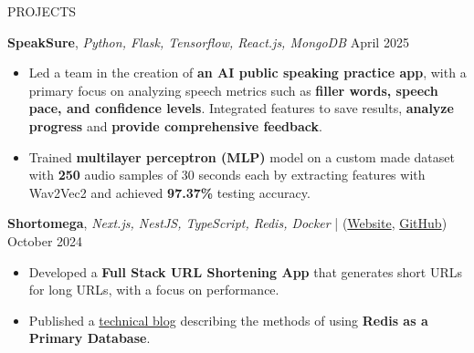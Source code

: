 \documentclass{resume} %
\begin{document}
\begin{rSection}{PROJECTS}
    \item \textbf{SpeakSure}, \textit{Python, Flask, Tensorflow, React.js, MongoDB}  \hfill {April 2025}
    \begin{itemize}
        \setlength\itemsep{-0.6em}
        \item  Led a team in the creation of \textbf{an AI public speaking practice app}, with
              a primary focus on analyzing speech metrics such as \textbf{filler words,
                  speech pace, and confidence levels}. Integrated features to save results, \textbf{analyze progress} and \textbf{provide comprehensive feedback}.
        \item Trained \textbf{multilayer perceptron (MLP)} model on a custom made dataset with \textbf{250} audio samples of 30 seconds each by extracting features with Wav2Vec2 and achieved \textbf{97.37\%} testing accuracy.
    \end{itemize}

 \item \textbf{Shortomega}, \textit{Next.js, NestJS, TypeScript, Redis, Docker} | (\href{https://shortomega.vercel.app/} {Website}, \href{https://github.com/ninadnaik10/shortomega} {GitHub})  \hfill {October 2024}
    \begin{itemize}
        \setlength\itemsep{-0.6em}
        \item  Developed a \textbf{ Full Stack URL Shortening App} that generates short URLs for long URLs, with a focus on performance.
        \item  Published a \href{https://tech.ninadnaik.me/using-redis-as-a-primary-database}{technical blog} describing the methods of using \textbf{Redis as a Primary Database}.


\end{itemize}
\end{rSection}
\end{document}
